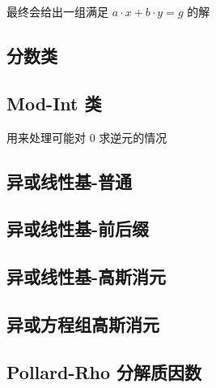\documentclass[12pt]{article}
\begin{document}
最终会给出一组满足 $a\cdot x+b\cdot y=g$ 的解



\subsection{分数类}



\newpage

\subsection{Mod-Int 类}

用来处理可能对 0 求逆元的情况



\newpage

\subsection{异或线性基-普通}



\newpage

\subsection{异或线性基-前后缀}



\newpage

\subsection{异或线性基-高斯消元}



\newpage

\subsection{异或方程组高斯消元}



\newpage

\subsection{Pollard-Rho 分解质因数}
\end{document}
